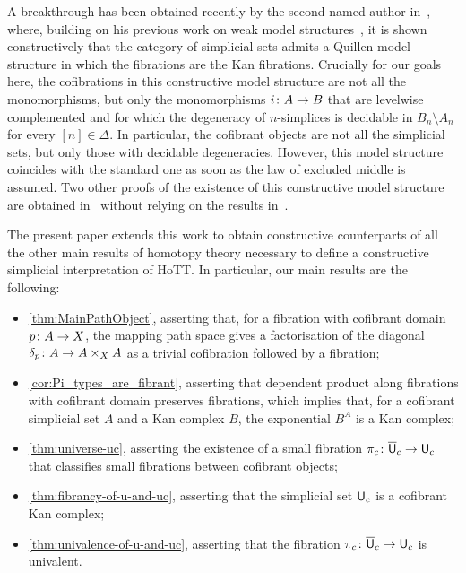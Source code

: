 \documentclass[reqno,10pt,a4paper,oneside,draft]{amsart}
\begin{document}
A breakthrough has been obtained recently by the second-named author in~\cite{henry2019qms}, where, building on his previous work on weak model structures~\cite{henry2018wms},
it is shown constructively that the category of simplicial sets admits a Quillen model structure in which the
fibrations are the Kan fibrations.  Crucially for our goals here, the cofibrations in this constructive model structure are
not all the monomorphisms, but only the monomorphisms $i \colon A \to B$ that are levelwise complemented 
and for which the degeneracy of $n$-simplices is decidable in $B_n \setminus A_n$ for every $[n] \in \Delta$. In particular, the cofibrant objects are not all the simplicial sets, but only those with decidable degeneracies. However, this model structure coincides with
the standard one as soon as the law of excluded middle is assumed. Two other  
proofs of the  existence of this constructive
model structure are obtained in~\cite{GambinoN:anocp} without relying on the results in~\cite{henry2018wms}. 


The present paper extends this work to obtain constructive counterparts of all the other main results of 
homotopy theory necessary to define a constructive simplicial interpretation of HoTT. In particular, our main results are the following:
\begin{itemize}
\item \cref{thm:MainPathObject}, asserting that, for a fibration with cofibrant domain $p \colon A \to X$, the mapping path space 
gives a factorisation of the diagonal $\delta_p \colon A \to A \times_X A$ as a trivial cofibration followed by a fibration;
\item \cref{cor:Pi_types_are_fibrant}, asserting that dependent product along fibrations with cofibrant
domain preserves fibrations, which implies that, for a cofibrant simplicial set $A$ and a Kan complex $B$, the exponential $B^A$ is a Kan complex; 
\item \cref{thm:universe-uc}, asserting the existence of a small fibration $\pi_c \colon
\overline{\mathsf{U}}_c \to \mathsf{U}_c$ that classifies small fibrations between cofibrant objects;
\item \cref{thm:fibrancy-of-u-and-uc}, asserting that the simplicial set $\mathsf{U}_c$ is a cofibrant Kan complex;
\item \cref{thm:univalence-of-u-and-uc}, asserting that the fibration $\pi_c  \colon
\overline{\mathsf{U}}_c \to \mathsf{U}_c$ is univalent.
\end{itemize}
\end{document}
